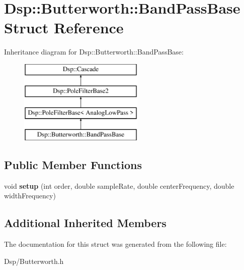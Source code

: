 \hypertarget{structDsp_1_1Butterworth_1_1BandPassBase}{\section{Dsp\-:\-:Butterworth\-:\-:Band\-Pass\-Base Struct Reference}
\label{structDsp_1_1Butterworth_1_1BandPassBase}
}
Inheritance diagram for Dsp\-:\-:Butterworth\-:\-:Band\-Pass\-Base\-:\begin{figure}[H]
\begin{center}
\leavevmode
\includegraphics[height=4.000000cm]{structDsp_1_1Butterworth_1_1BandPassBase}
\end{center}
\end{figure}
\subsection*{Public Member Functions}
\begin{DoxyCompactItemize}
\item 
\hypertarget{structDsp_1_1Butterworth_1_1BandPassBase_ae9ebc058dd7c95933bab1e22a2792a03}{void {\bfseries setup} (int order, double sample\-Rate, double center\-Frequency, double width\-Frequency)}\label{structDsp_1_1Butterworth_1_1BandPassBase_ae9ebc058dd7c95933bab1e22a2792a03}

\end{DoxyCompactItemize}
\subsection*{Additional Inherited Members}


The documentation for this struct was generated from the following file\-:\begin{DoxyCompactItemize}
\item 
Dsp/Butterworth.\-h\end{DoxyCompactItemize}
